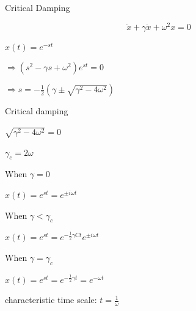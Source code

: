 \documentclass[9pt,aspectratio=43,mathserif,table]{beamer}
\begin{document}
\begin{frame}{Critical Damping}

  $$\ddot x + \gamma\dot x + \omega^2 x = 0$$
  \begin{multicols}{2}
    $x(t) = e ^{-st}$

    $\Rightarrow (s^2 - \gamma s + \omega ^2)e^{st} = 0$

    $\Rightarrow s = -\frac{ 1}{2} (\gamma \pm \sqrt{\gamma^2 - 4 \omega ^2})$

    \bigskip

    Critical damping

    $\sqrt{\gamma^2 - 4 \omega ^2} = 0$

    $\gamma_c = 2 \omega $

    \bigskip

    When $\gamma = 0$ 

    $x(t) = e^{st} = e^{\pm i\omega t}$

    \medskip

    When $\gamma < \gamma_c$ 

    $x(t) = e^{st} = e^{-\frac{ 1}{2}\gamma C t}e^{\pm i\omega t}$

    \medskip

    When $\gamma = \gamma_c$ 

    $x(t) = e^{st} = e^{-\frac{ 1}{2}\gamma t} = e^{-\omega t}$

    characteristic time scale: $t = \frac{ 1}{\omega }$

  \end{multicols}
\end{frame}
\end{document}
